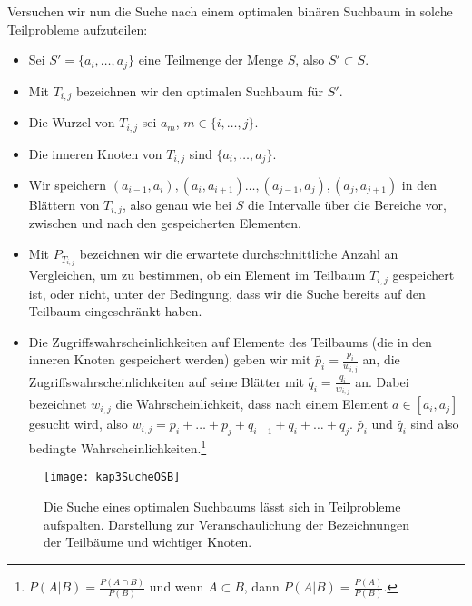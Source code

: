 Versuchen wir nun die Suche nach einem optimalen binären Suchbaum in solche Teilprobleme aufzuteilen:
\begin{itemize}
  \item Sei $S'=\{a_i, \ldots, a_j\}$ eine Teilmenge  der Menge $S$, also $S' \subset S$.
  \item Mit $T_{i,j}$ bezeichnen wir den optimalen Suchbaum für $S'$.
  \item Die Wurzel von $T_{i,j}$ sei $a_m$, $m \in \{i, \ldots, j\}$.
  \item Die inneren Knoten von $T_{i,j}$ sind $\{a_i, \ldots, a_j\}$.
  \item Wir speichern $(a_{i-1}, a_i), (a_i, a_{i+1}) \ldots, (a_{j-1}, a_j), (a_j, a_{j+1})$ in den Blättern von $T_{i,j}$, also genau wie bei $S$ die Intervalle über die Bereiche vor, zwischen und nach den gespeicherten Elementen.
  \item Mit $P_{T_{i,j}}$ bezeichnen wir die erwartete durchschnittliche Anzahl an Vergleichen, um zu bestimmen, ob ein Element im Teilbaum $T_{i,j}$ gespeichert ist, oder nicht, unter der Bedingung, dass wir die Suche bereits auf den Teilbaum eingeschränkt haben.
  \item Die Zugriffswahrscheinlichkeiten auf Elemente des Teilbaums (die in den inneren Knoten gespeichert werden) geben wir mit $\widetilde{p_i} = \frac{p_i}{w_{i,j}}$ an, die Zugriffswahrscheinlichkeiten auf seine Blätter mit $\widetilde{q_i} = \frac{q_i}{w_{i,j}}$ an. Dabei bezeichnet $w_{i,j}$ die Wahrscheinlichkeit, dass nach einem Element $a \in [a_i, a_j]$ gesucht wird, also $w_{i,j} = p_i + \ldots + p_j + q_{i-1} + q_i + \ldots + q_j$. $\widetilde{p_i}$ und $\widetilde{q_i}$ sind also bedingte Wahrscheinlichkeiten.\footnote{$P(A|B)=\frac{P(A \cap B)}{P(B)}$ und wenn $A \subset B$, dann $P(A|B) = \frac{P(A)}{P(B)}$.}
\end{itemize}

\begin{figure}[hbt]
  \centering
  \texttt{[image: kap3SucheOSB]}
  \caption{Die Suche eines optimalen Suchbaums lässt sich in Teilprobleme aufspalten. Darstellung zur Veranschaulichung der Bezeichnungen der Teilbäume und wichtiger Knoten.}
  \label{kap3SucheOSB}
\end{figure}

